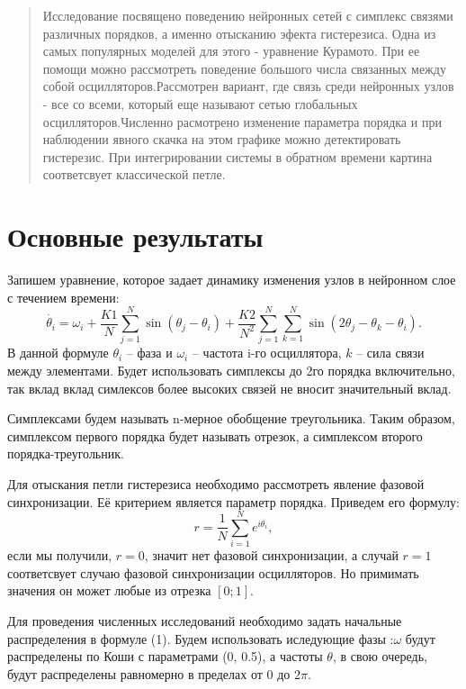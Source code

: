 \begin{abstract}
Исследование посвящено поведению нейронных сетей с симплекс связями различных порядков, а именно отысканию эфекта гистерезиса. Одна из самых популярных моделей для этого - уравнение Курамото. При ее помощи можно рассмотреть поведение большого числа связанных между собой осцилляторов.Рассмотрен вариант, где связь среди нейронных узлов -   все со всеми, который еще называют сетью глобальных осцилляторов.Численно расмотрено изменение параметра порядка и при наблюдении явного скачка на этом графике можно детектировать гистерезис. При интегрировании системы в обратном времени картина соответсвует классической петле. 
  

\end{abstract}

\section{Основные результаты} %
Запишем уравнение, которое задает динамику изменения узлов в нейронном слое с течением времени:
\begin{equation}\dot{\theta_i}= \omega_i+\frac{K1}{N}\sum^{N}_{j=1} \sin(\theta_j-\theta_i)+\frac{K2}{N^2} \sum^{N}_{j=1} \sum^{N}_{k=1}  \sin (2\theta_j-\theta_k-\theta_i).\end{equation}
В данной формуле $\theta_i$ -- фаза и $\omega_i$ -- частота i-го осциллятора, $k$ -- сила связи между элементами.
Будет использовать симплексы до 2го порядка включительно, так вклад вклад симлексов более высоких связей не вносит значительный вклад.

 Симплексами будем называть n-мерное обобщение треугольника. Таким образом, симплексом первого порядка будет называть отрезок, а симплексом второго порядка-треугольник.

 Для отыскания петли гистерезиса необходимо рассмотреть явление фазовой синхронизации. Её критерием является параметр порядка.
Приведем его формулу: 
\begin{equation} r  =\frac{1}{N} \sum^{N}_{i=1} e^{i \theta_i}, \end{equation} если мы получили, $r=0$, значит   нет фазовой синхронизации, а случай $r=1$ соответсвует случаю фазовой синхронизации осцилляторов. Но примимать значения он может любые из отрезка $[0;1]$.

Для проведения численных исследований необходимо задать начальные распределения в формуле (1). Будем использовать иследующие фазы :$\omega$ будут распределены по Коши с параметрами (0, 0.5), а частоты $\theta$, в свою очередь, будут распределены равномерно в пределах от $0$ до $2\pi$.

